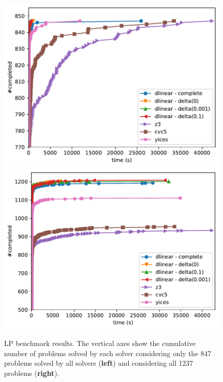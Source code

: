 \documentclass[runningheads]{llncs}
\begin{document}



\begin{figure}
    \centering
\includegraphics[width=0.45\linewidth]{img/on_file_lp.pdf}
    \hspace{1cm}
\includegraphics[width=0.45\linewidth]{img/total_lp.pdf}
    \caption{LP benchmark results. The vertical axes show the cumulative number of problems solved by each solver considering only the 847 problems solved by all solvers (\textbf{left}) and considering all 1237 problems (\textbf{right}). 
    }
    \label{fig:results-lp}
\end{figure}
\end{document}
